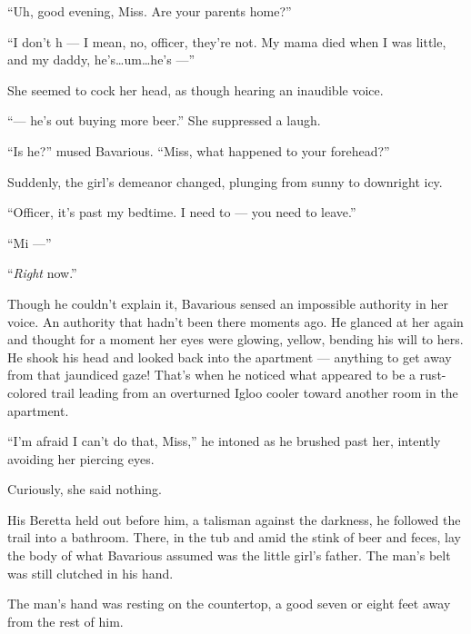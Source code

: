 ``Uh, good evening, Miss. Are your parents home?''



``I don't h --- I mean, no, officer, they're not. My mama died when I
was little, and my daddy, he's{\ldots}um{\ldots}he's ---''



She seemed to cock her head, as though hearing an inaudible
voice.



``--- he's out buying more beer.'' She suppressed a laugh.



``Is he?'' mused Bavarious. ``Miss, what happened to your
forehead?''



Suddenly, the girl's demeanor changed, plunging from sunny to
downright icy.



``Officer, it's past my bedtime. I need to --- you need to
leave.''



``Mi ---''



``{\em Right} now.''



Though he couldn't explain it, Bavarious sensed an impossible
authority in her voice. An authority that hadn't been there moments
ago. He glanced at her again and thought for a moment her eyes were
glowing, yellow, bending his will to hers. He shook his head and
looked back into the apartment --- anything to get away from that
jaundiced gaze! That's when he noticed what appeared to be a
rust-colored trail leading from an overturned Igloo cooler toward
another room in the apartment.



``I'm afraid I can't do that, Miss,'' he intoned as he brushed past
her, intently avoiding her piercing eyes.



Curiously, she said nothing.



His Beretta held out before him, a talisman against the darkness,
he followed the trail into a bathroom. There, in the tub and amid
the stink of beer and feces, lay the body of what Bavarious assumed
was the little girl's father. The man's belt was still clutched in
his hand.



The man's hand was resting on the countertop, a good seven or eight
feet away from the rest of him.



